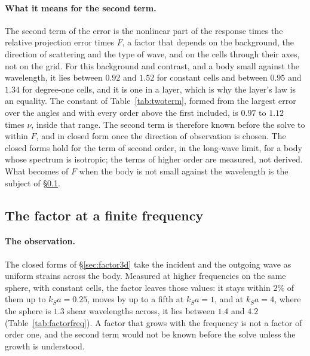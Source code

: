 \documentclass[11pt,a4paper]{article}
\begin{document}
\paragraph{What it means for the second term.} The second term of the error is the nonlinear part of the
response times the relative projection error times $F$, a factor that depends on the
background, the direction of scattering and the type of wave, and on the cells through their axes, not
on the grid. For this background and contrast, and a body small against the wavelength, it lies between
$0.92$ and $1.52$ for constant cells and
between $0.95$ and $1.34$ for degree-one cells, and it is one in a layer, which is why the layer's law is an
equality. The constant of Table~\ref{tab:twoterm}, formed from the largest error over the angles and
with every order above the first included, is $0.97$ to $1.12$ times $\nu$, inside that range. The second term is therefore known before
the solve to within $F$, and in closed form once the direction of observation is chosen. The closed forms
hold for the term of second order, in the long-wave limit, for a body whose spectrum is isotropic; the
terms of higher order are measured, not derived. What becomes of $F$ when the body is not small against
the wavelength is the subject of \S\ref{sec:factorfreq}.

\subsection{The factor at a finite frequency}\label{sec:factorfreq}

\paragraph{The observation.} The closed forms of \S\ref{sec:factor3d} take the incident and the outgoing
wave as uniform strains across the body. Measured at higher frequencies on the same sphere, with constant
cells, the factor leaves those values: it stays within $2\%$ of them up to $k_Sa=0.25$, moves by up to a
fifth at $k_Sa=1$, and at $k_Sa=4$, where the sphere is $1.3$ shear wavelengths across, it lies between
$1.4$ and $4.2$ (Table~\ref{tab:factorfreq}). A factor that grows with the frequency is not a factor of
order one, and the second term would not be known before the solve unless the growth is understood.
\end{document}
